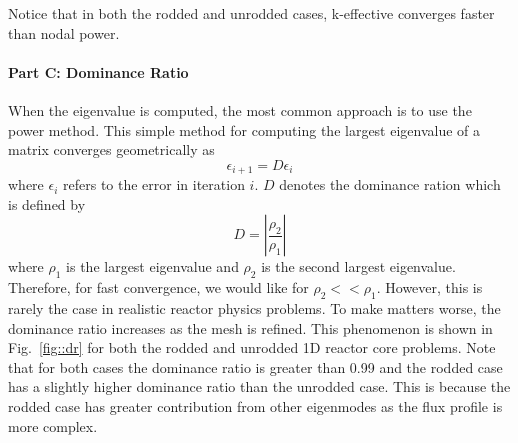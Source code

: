 \documentclass[12pt]{report}
\begin{document}
	Notice that in both the rodded and unrodded cases, k-effective converges faster than nodal power.
		
	\clearpage
	\paragraph{Part C: Dominance Ratio}
	When the eigenvalue is computed, the most common approach is to use the power method. This simple method for computing the largest eigenvalue of a matrix converges geometrically as
	\begin{equation}
	\epsilon_{i+1} = D \epsilon_{i}
	\end{equation}
	where $\epsilon_i$ refers to the error in iteration $i$. $D$ denotes the dominance ration which is defined by
	\begin{equation}
	D = \left| \frac{\rho_2}{\rho_1} \right|
	\end{equation}
	where $\rho_1$ is the largest eigenvalue and $\rho_2$ is the second largest eigenvalue. Therefore, for fast convergence, we would like for $\rho_2 << \rho_1$. However, this is rarely the case in realistic reactor physics problems. To make matters worse, the dominance ratio increases as the mesh is refined. This phenomenon is shown in Fig.~\ref{fig::dr} for both the rodded and unrodded 1D reactor core problems. Note that for both cases the dominance ratio is greater than 0.99 and the rodded case has a slightly higher dominance ratio than the unrodded case. This is because the rodded case has greater contribution from other eigenmodes as the flux profile is more complex.
	
\end{document}
